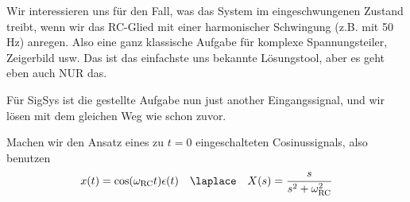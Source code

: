 \begin{Loesung}
\begin{itemize}
Wir interessieren uns für den Fall, was das System im eingeschwungenen Zustand
treibt, wenn wir das RC-Glied mit einer harmonischer Schwingung (z.B. mit 50 Hz) anregen.
Also eine ganz klassische Aufgabe für komplexe Spannungsteiler, Zeigerbild usw.
Das ist das einfachste uns bekannte Lösungstool, aber es geht eben auch
NUR das.

Für SigSys ist die gestellte Aufgabe nun just another Eingangssignal, und wir lösen
mit dem gleichen Weg wie schon zuvor.

Machen wir den Ansatz eines zu $t=0$ eingeschalteten Cosinussignals, also benutzen
\begin{equation}
x(t)=\cos(\omega_\mathrm{RC} t ) \epsilon(t) \quad \laplace \quad X(s)=\frac{s}{s^2+\omega_\mathrm{RC}^2}
\end{equation}


\end{itemize}
\end{Loesung}
